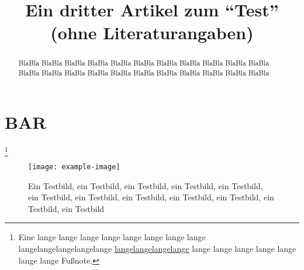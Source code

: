 \documentclass{dtk}
\begin{document}
\title{Ein dritter Artikel zum "`Test"' (ohne Literaturangaben)}

\maketitle

\begin{abstract}
BlaBla BlaBla BlaBla BlaBla BlaBla BlaBla BlaBla BlaBla BlaBla BlaBla BlaBla
BlaBla BlaBla BlaBla BlaBla BlaBla BlaBla BlaBla BlaBla BlaBla BlaBla BlaBla
\end{abstract}

\section{BAR}

\blindtext\footnote*{Eine lange lange lange lange lange lange lange lange
\mbox{langelangelangelangelange} \url{langelangelangelange} lange lange lange
lange lange lange lange
Fußnote.}%

\begin{figure}[p] \centering
  \texttt{[image: example-image]}
  \caption{Ein Testbild, ein Testbild, ein Testbild, ein Testbild, ein
  Testbild, ein Testbild, ein Testbild, ein Testbild, ein Testbild, ein
  Testbild, ein Testbild, ein Testbild}
\end{figure}
\end{document}
